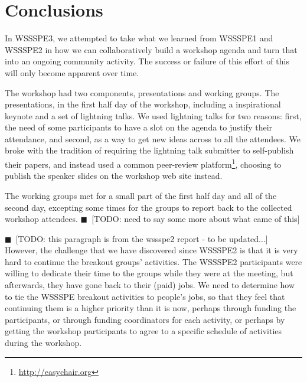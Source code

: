 \documentclass[11pt, oneside]{amsart}
\newcommand{\todo}[1]{{\color{blue}$\blacksquare$~\textsf{[TODO: #1]}}}
\begin{document}
\section{Conclusions} \label{sec:conclusions}

In WSSSPE3, we attempted to take what we learned from WSSSPE1 and WSSSPE2
in how we can collaboratively build a workshop agenda and turn that into
an ongoing community activity.  The success or failure of this effort
of this will only become apparent over time.

The workshop had two components, presentations and working groups.  The presentations,
in the first half day of the workshop, including a inspirational keynote and a set of lightning
talks.
We used lightning talks for two reasons: first, the need of some participants to have a slot
on the agenda to justify their attendance, and second, as a way to get new ideas across
to all the attendees.  We broke with the tradition of requiring the lightning talk submitter
to self-publish their papers, and instead used a common peer-review platform\footnote{\url{http://easychair.org}}, choosing to publish the speaker slides on the workshop web site
instead.

The working groups met for a small part of the first half day and all of the second day,
excepting some times for the groups to report back to the collected workshop attendees.
\todo{need to say some more about what came of this}

\todo{this paragraph is from the wssspe2 report - to be updated...}
However, the challenge that we have discovered
since WSSSPE2 is that it is very hard to continue the breakout groups'
activities.  The WSSSPE2 participants were willing to dedicate their time to
the groups while they were at the meeting, but afterwards, they have gone
back to their (paid) jobs.  We need to determine how to tie the WSSSPE
breakout activities to people's jobs, so that they feel that continuing them
is a higher priority than it is now, perhaps through funding the participants,
or through funding coordinators for each activity, or perhaps by getting
the workshop participants to agree to a specific schedule of activities during the
workshop.
\end{document}
